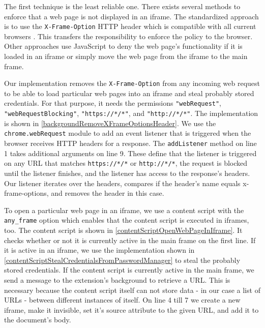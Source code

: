 	The first technique is the least reliable one. There exists several methods to enforce that a web page is not displayed in an iframe. The standardized approach is to use the \texttt{X-Frame-Option} HTTP header which is compatible with all current browsers \cite{xFrameOptionsSpezification, xFrameOptionsCompability}. This transfers the responsibility to enforce the policy to the browser. Other approaches use JavaScript to deny the web page's functionality if it is loaded in an iframe or simply move the web page from the iframe to the main frame. 
	
	Our implementation removes the \texttt{X-Frame-Option} from any incoming web request to be able to load particular web pages into an iframe and steal probably stored credentials. For that purpose, it needs the permissions \texttt{"webRequest"}, \texttt{"webRequestBlocking"}, \texttt{"https://*/*"}, and \texttt{"http://*/*"}. The implementation is shown in \autoref{backgroundRemoveXFrameOptionsHeader}. We use the \texttt{chrome.webRequest} module to add an event listener that is triggered when the browser receives HTTP headers for a response. The \texttt{addListener} method on line 1 takes additional arguments on line 9. These define that the listener is triggered on any URL that matches \texttt{https://*/*} or \texttt{http://*/*}, the request is blocked until the listener finishes, and the listener has access to the response's headers. Our listener iterates over the headers, compares if the header's name equals x-frame-options, and removes the header in this case. 
	
	To open a particular web page in an iframe, we use a content script with the \texttt{any\_frame} option which enables that the content script is executed in iframes, too. The content script is shown in \autoref{contentScriptOpenWebPageInIframe}. It checks whether or not it is currently active in the main frame on the first line. If it is active in an iframe, we use the implementation shown in \autoref{contentScriptStealCredentialsFromPasswordManager} to steal the probably stored credentials. If the content script is currently active in the main frame, we send a message to the extension's background to retrieve a URL. This is necessary because the content script itself can not store data - in our case a list of URLs - between different instances of itself. On line 4 till 7 we create a new iframe, make it invisible, set it's source attribute to the given URL, and add it to the document's body. \\
	
